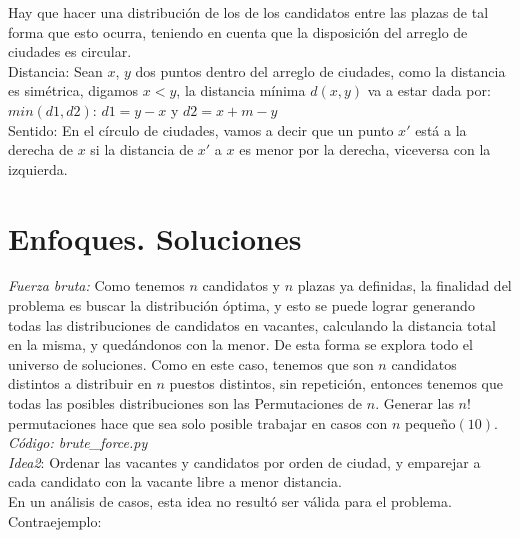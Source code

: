 \documentclass{article}
\begin{document}
Hay que hacer una distribuci\'on de los de los candidatos entre las plazas de tal forma que esto ocurra, teniendo en cuenta que la disposici\'on del arreglo de ciudades es circular.\\

 Distancia: Sean $x$, $y$ dos puntos dentro del arreglo de ciudades, como la distancia es sim\'etrica, digamos $x<y$, la distancia m\'inima $d(x,y)$ va a estar dada por:\\
 
 
    $min(d1,d2)$: $d1 = y-x$ y $d2 = x+m-y$\\
    
Sentido: En el c\'irculo de ciudades, vamos a decir que un punto $x'$ est\'a a la derecha de $x$ si la distancia de $x'$ a $x$ es menor por la derecha, viceversa con la izquierda.\\
    


\section{Enfoques. Soluciones}

\textit{Fuerza bruta:} Como tenemos $n$ candidatos y $n$ plazas ya definidas, la finalidad del problema es buscar la distribuci\'on \'optima, y esto se puede lograr generando todas las distribuciones de candidatos en vacantes, calculando la distancia total en la misma, y qued\'andonos con la menor. De esta forma se explora todo el universo de soluciones. Como en este caso, tenemos que son $n$ candidatos distintos a distribuir en $n$ puestos distintos, sin repetici\'on, entonces tenemos que todas las posibles distribuciones son las Permutaciones de $n$. Generar las $n!$ permutaciones hace que sea solo posible trabajar en casos con $n$ peque\~no$(10)$.\\
\textit{C\'odigo: brute\_force.py}\\


\textit{Idea2}: Ordenar las vacantes y candidatos por orden de ciudad, y emparejar a cada candidato con la vacante libre a menor distancia.\\ 
En un an\'alisis de casos, esta idea no result\'o ser v\'alida para el problema.\\

Contraejemplo:\\\
\end{document}
